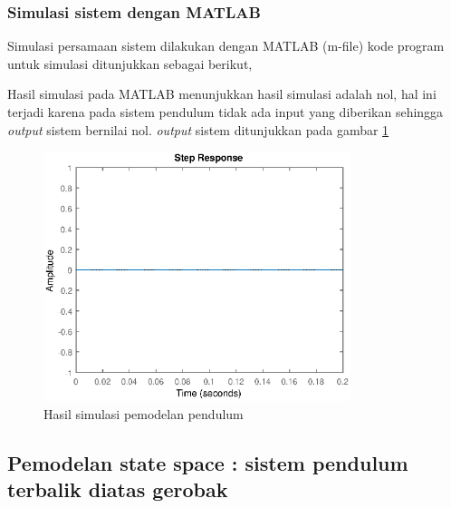 \documentclass[../cover.tex]{subfiles}
\begin{document}
        \subsubsection{Simulasi sistem dengan MATLAB}
            Simulasi persamaan sistem dilakukan dengan MATLAB (m-file) kode program untuk simulasi ditunjukkan sebagai berikut,
            \newline
            
            Hasil simulasi pada MATLAB menunjukkan hasil simulasi adalah nol, hal ini terjadi karena pada sistem pendulum tidak ada input yang diberikan sehingga \textit{output} sistem bernilai nol. \textit{output} sistem ditunjukkan pada gambar \ref{gambar_10}
            \begin{figure}[H]
                \centering
                \includegraphics[width = 0.8\textwidth]{assets/image/STATE_SPACE_PENDULUM.eps}
                \caption{Hasil simulasi pemodelan pendulum}
                \label{gambar_10}
            \end{figure}
    \subsection{Pemodelan state space : sistem pendulum terbalik diatas gerobak}
\end{document}

